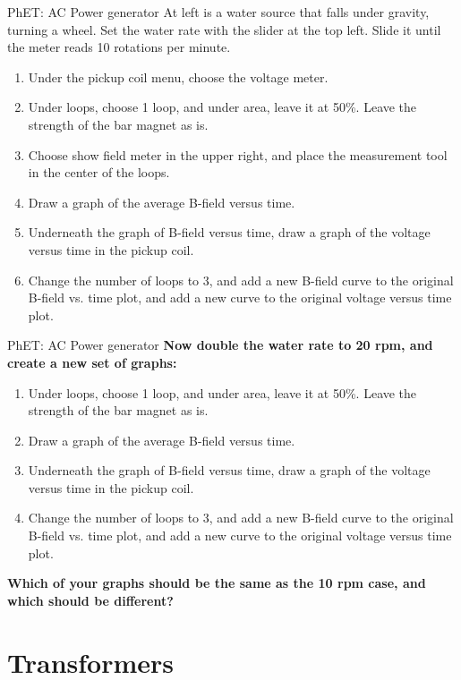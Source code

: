 \documentclass{beamer}
\begin{document}
\begin{frame}{PhET: AC Power generator}
\small
At left is a water source that falls under gravity, turning a wheel.  Set the water rate with the slider at the top left.  Slide it until the meter reads 10 rotations per minute.
\begin{enumerate}
\item Under the pickup coil menu, choose the voltage meter.
\item Under loops, choose 1 loop, and under area, leave it at 50\%.  Leave the strength of the bar magnet as is.
\item Choose show field meter in the upper right, and place the measurement tool in the center of the loops.
\item Draw a graph of the average B-field versus time.
\item Underneath the graph of B-field versus time, draw a graph of the voltage versus time in the pickup coil.
\item Change the number of loops to 3, and add a new B-field curve to the original B-field vs. time plot, and add a new curve to the original voltage versus time plot.
\end{enumerate}
\end{frame}

\begin{frame}{PhET: AC Power generator}
\small
\textbf{Now double the water rate to 20 rpm, and create a new set of graphs:}
\begin{enumerate}
\item Under loops, choose 1 loop, and under area, leave it at 50\%.  Leave the strength of the bar magnet as is.
\item Draw a graph of the average B-field versus time.
\item Underneath the graph of B-field versus time, draw a graph of the voltage versus time in the pickup coil.
\item Change the number of loops to 3, and add a new B-field curve to the original B-field vs. time plot, and add a new curve to the original voltage versus time plot.
\end{enumerate}
\textbf{Which of your graphs should be the same as the 10 rpm case, and which should be different?}
\end{frame}

\section{Transformers}
\end{document}

